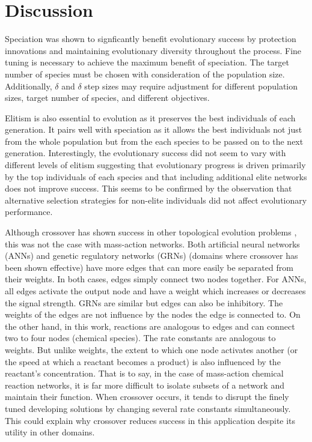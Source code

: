 \documentclass[12pt]{report}
\begin{document}
\section{Discussion}
Speciation was shown to signficantly benefit evolutionary success by protection innovations and maintaining evolutionary diversity throughout the process. Fine tuning is necessary to achieve the maximum benefit of speciation. The target number of species must be chosen with consideration of the population size. Additionally, $\delta$ and $\delta$ step sizes may require adjustment for different population sizes, target number of species, and different objectives. 

Elitism is also essential to evolution as it preserves the best individuals of each generation. It pairs well with speciation as it allows the best individuals not just from the whole population but from the each species to be passed on to the next generation. Interestingly, the evolutionary success did not seem to vary with different levels of elitism suggesting that evolutionary progress is driven primarily by the top individuals of each species and that including additional elite networks does not improve success. This seems to be confirmed by the observation that alternative selection strategies for non-elite individuals did not affect evolutionary performance.

Although crossover has shown success in other topological evolution problems \cite{stanley_evolving_2002, dinh_effective_2015}, this was not the case with mass-action networks. Both artificial neural networks (ANNs) and genetic regulatory networks (GRNs) (domains where crossover has been shown effective) have more edges that can more easily be separated from their weights. In both cases, edges simply connect two nodes together. For ANNs, all edges activate the output node and have a weight which increases or decreases the signal strength. GRNs are similar but edges can also be inhibitory. The weights of the edges are not influence by the nodes the edge is connected to. On the other hand, in this work, reactions are analogous to edges and can connect two to four nodes (chemical species). The rate constants are analogous to weights. But unlike weights, the extent to which one node activates another (or the speed at which a reactant becomes a product) is also influenced by the reactant's concentration. That is to say, in the case of mass-action chemical reaction networks, it is far more difficult to isolate subsets of a network and maintain their function. When crossover occurs, it tends to disrupt the finely tuned developing solutions by changing several rate constants simultaneously. This could explain why crossover reduces success in this application despite its utility in other domains. 
\end{document}
